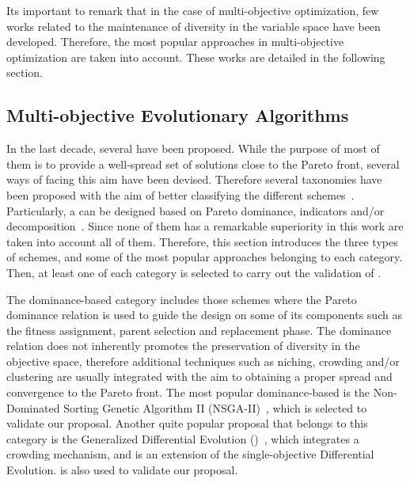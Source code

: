 Its important to remark that in the case of multi-objective optimization, few works related to the maintenance of diversity in the variable space
have been developed.
%
Therefore, the most popular approaches in multi-objective optimization are taken into account.
%
These works are detailed in the following section.

\subsection{Multi-objective Evolutionary Algorithms}

In the last decade, several \MOEAS{} have been proposed. 
%
While the purpose of most of them is to provide a well-spread set of solutions close to the Pareto front,
several ways of facing this aim have been devised.
%
Therefore several taxonomies have been proposed with the aim of better classifying the different schemes~\cite{Joel:BOOK_MOEAs}.
%
Particularly, a \MOEA{} can be designed based on Pareto dominance, indicators and/or decomposition~\cite{Joel:StateArt}.
%
%
Since none of them has a remarkable superiority in this work are taken into account all of them.
%
Therefore, this section introduces the three types of schemes, and some of the most popular approaches belonging to each category.
%
Then, at least one \MOEA{} of each category is selected to carry out the validation of \VSDMOEA{}.

The dominance-based category includes those schemes where the Pareto dominance relation is used to guide the design on some of its components such as the
fitness assignment, parent selection and replacement phase.
%
The dominance relation does not inherently promotes the preservation of diversity in the objective space, therefore additional techniques such as niching, crowding and/or clustering 
are usually integrated with the aim to obtaining a proper spread and convergence to the Pareto front.
%
The most popular dominance-based \MOEA{} is the Non-Dominated Sorting Genetic Algorithm II (NSGA-II)~\cite{Joel:NSGAII}, which is selected to validate our proposal.
%
Another quite popular proposal that belongs to this category is the Generalized Differential Evolution (\GDEIII{})~\cite{Joel:GDE3}, which integrates a crowding mechanism, and is an extension of the single-objective
Differential Evolution.
%
\GDEIII{} is also used to validate our proposal.

